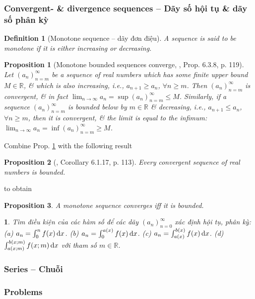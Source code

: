 \documentclass{article}
\newtheorem{baitoan}{}
\newtheorem{definition}{Definition}
\newtheorem{proposition}{Proposition}
\begin{document}
\subsubsection{Convergent- \& divergence sequences -- Dãy số hội tụ \& dãy số phân kỳ}

\begin{definition}[Monotone sequence -- dãy đơn điệu]
	A sequence is said to be {\rm monotone} if it is either increasing or decreasing.
\end{definition}

\begin{proposition}[Monotone bounded sequences converge, \cite{Tao_analysis_1}, Prop. 6.3.8, p. 119]
	\label{prop: monotone bounded sequences converge}
	Let $(a_n)_{n=m}^\infty$ be a sequence of real numbers which has some finite upper bound $M\in\mathbb{R}$, \& which is also increasing, i.e., $a_{n+1}\ge a_n$, $\forall n\ge m$. Then $(a_n)_{n=m}^\infty$ is convergent, \& in fact $\lim_{n\to\infty} a_n = \sup(a_n)_{n=m}^\infty\le M$. Similarly, if a sequence $(a_n)_{n=m}^\infty$ is bounded below by $m\in\mathbb{R}$ \& decreasing, i.e., $a_{n+1}\le a_n$, $\forall n\ge m$, then it is convergent, \& the limit is equal to the infimum: $\lim_{n\to\infty} a_n = \inf(a_n)_{n=m}^\infty\ge M$.
\end{proposition}
Combine Prop. \ref{prop: monotone bounded sequences converge} with the following result
\begin{proposition}[\cite{Tao_analysis_1}, Corollary 6.1.17, p. 113]
	Every convergent sequence of real numbers is bounded.
\end{proposition}
to obtain
\begin{proposition}
	A monotone sequence converges iff it is bounded.
\end{proposition}

\begin{baitoan}
	Tìm điều kiện của các hàm số để các dãy $(a_n)_{n=0}^\infty$ xác định hội tụ, phân kỳ: (a) $a_n = \int_0^n f(x)\,{\rm d}x$. (b) $a_n = \int_0^{a(x)} f(x)\,{\rm d}x$. (c) $a_n = \int_{a(x)}^{b(x)} f(x)\,{\rm d}x$. (d) $\int_{a(x;m)}^{b(x;m)} f(x;m)\,{\rm d}x$ với tham số $m\in\mathbb{R}$.
\end{baitoan}

\subsubsection{Series -- Chuỗi}

\subsubsection{Problems}
\end{document}
